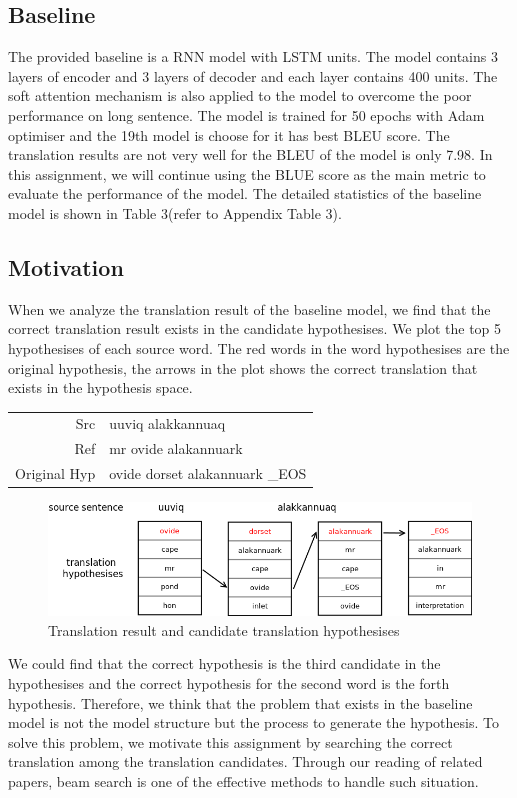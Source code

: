 \documentclass[a4paper]{article}
\begin{document}
\subsection{Baseline}
The provided baseline is a RNN model with LSTM units. The model contains 3 layers of encoder and 3 layers of decoder and each layer contains 400 units. The soft attention mechanism is also applied to the model to overcome the poor performance on long sentence. The model is trained for 50 epochs with Adam optimiser and the 19th model is choose for it has best BLEU score. The translation results are not very well for the BLEU of the model is only 7.98. In this assignment, we will continue using the BLUE score as the main metric to evaluate the performance of the model. The detailed statistics of the baseline model is shown in Table 3(refer to Appendix Table 3).

\subsection{Motivation}
When we analyze the translation result of the baseline model, we find that the correct translation result exists in the candidate hypothesises. We plot the top 5 hypothesises of each source word. The red words in the word hypothesises are the original hypothesis, the arrows in the plot shows the correct translation that exists in the hypothesis space.  
\begin{center}
\begin{tabular}{r l}
Src & uuviq alakkannuaq \\
Ref & mr ovide alakannuark \\
Original Hyp & ovide dorset alakannuark \_EOS
\end{tabular}
\end{center}

\begin{figure}[h]
\begin{center}
\includegraphics[width=5in]{translation_hyp}
\caption{Translation result and candidate translation hypothesises}
\end{center}
\end{figure}
We could find that the correct hypothesis is the third candidate in the hypothesises and the correct hypothesis for the second word is the forth hypothesis. Therefore, we think that the problem that exists in the baseline model is not the model structure but the process to generate the hypothesis. To solve this problem, we motivate this assignment by searching the correct translation among the translation candidates. Through our reading of related papers, beam search is one of the effective methods to handle such situation.
\end{document}

